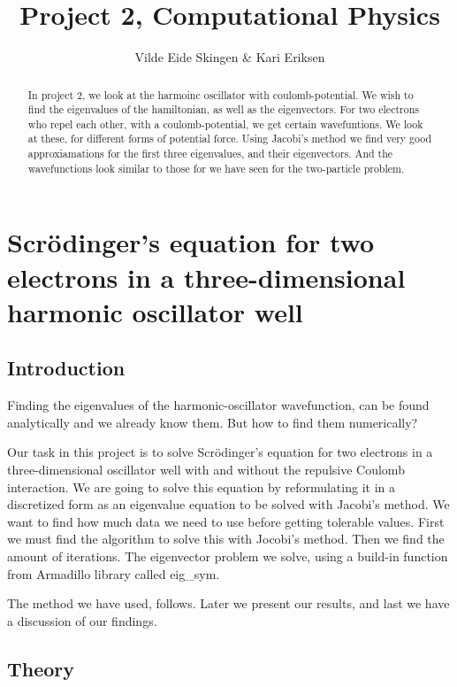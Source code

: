 \documentclass[a4paper,12pt, english]{article}
\title{Project 2, Computational Physics}
\author{Vilde Eide Skingen & Kari Eriksen}
\begin{document}
\maketitle
\titlepage{}

\begin{abstract}
In project 2, we look at the harmoinc oscillator with coulomb-potential. We wish to find the eigenvalues of the hamiltonian, as well as the eigenvectors. For two electrons who repel each other, with a coulomb-potential, we get certain wavefuntions. We look at these, for different forms of potential force. Using Jacobi's method we find very good approxiamations for the first three eigenvalues, and their eigenvectors. And the wavefunctions look similar to those for we have seen for the two-particle problem.

\end{abstract}


\section{Scr\"odinger's equation for two electrons in a three-dimensional harmonic oscillator well }

\subsection{Introduction}

Finding the eigenvalues of the harmonic-oscillator wavefunction, can be found analytically and we already know them. But how to find them numerically?

Our task in this project is to solve Scr\"odinger's equation for two electrons in a three-dimensional oscillator well with and without the repulsive Coulomb interaction. We are going to solve this equation by reformulating it in a discretized form as an eigenvalue equation to be solved with Jacobi's method. We want to find how much data we need to use before getting tolerable values. First we must find the algorithm to solve this with Jocobi's method. Then we find the amount of iterations. 
The eigenvector problem we solve, using a build-in function from Armadillo library called eig\_sym. 

The method we have used, follows. Later we present our results, and last we have a discussion of our findings.

\subsection{Theory}
\end{document}
